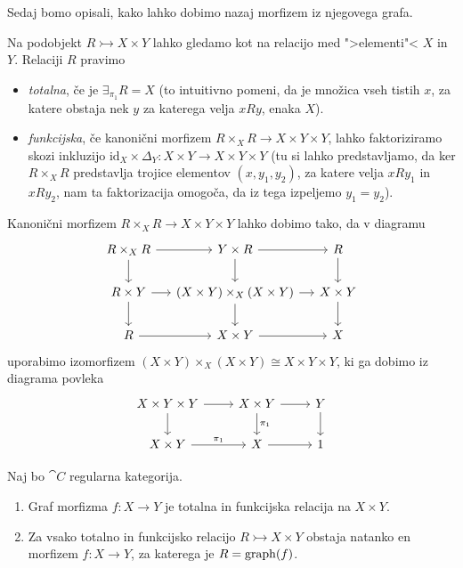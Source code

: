 \documentclass[../kategoricna_logika.tex]{subfiles}
\begin{document}
Sedaj bomo opisali, kako lahko dobimo nazaj morfizem iz njegovega
grafa.
\begin{definicija}
  Na podobjekt $R \rightarrowtail X \times Y$ lahko gledamo kot na
  relacijo med ">elementi"< $X$ in $Y$. Relaciji $R$ pravimo
  \begin{itemize}
  \item \emph{totalna}, če je $\exists_{\pi_1}R = X$ (to intuitivno
    pomeni, da je množica vseh tistih $x$, za katere obstaja nek $y$
    za katerega velja $xRy$, enaka $X$).
  \item \emph{funkcijska}, če kanonični morfizem
    $R \times_X R \to X \times Y \times Y$, lahko faktoriziramo skozi
    inkluzijo
    $\mathrm{id}_X \times \Delta_Y : X \times Y \to X \times Y \times
    Y$ (tu si lahko predstavljamo, da ker $R \times_X R$ predstavlja
    trojice elementov $(x, y_1, y_2)$, za katere velja $xRy_1$ in
    $xRy_2$, nam ta faktorizacija omogoča, da iz tega izpeljemo
    $y_1 = y_2$).
  \end{itemize}
\end{definicija}
\begin{opomba}
  Kanonični morfizem $R \times_X R \to X \times Y \times Y$ lahko
  dobimo tako, da v diagramu
  \begin{equation*}
    \begin{tikzcd}[row sep=normal, column sep=small]
      R \times_X R \ar[d] \ar[r] & Y \times R \ar[d] \ar[r] & R \ar[d] \\
      R \times Y \ar[d] \ar[r] & (X \times Y) \times_X (X \times Y)
      \ar[d] \ar[r] &
      X \times Y \ar[d] \\
      R \ar[r] & X \times Y \ar[r] & X
    \end{tikzcd}
  \end{equation*}
  uporabimo izomorfizem
  $(X \times Y) \times_X (X \times Y) \cong X \times Y \times Y$, ki
  ga dobimo iz diagrama povleka
  \begin{equation*}
    \begin{tikzcd}[row sep=normal, column sep=normal]
      X \times Y  \times Y\ar[d] \ar[r] & X \times Y \ar[d, "\pi_1"] \ar[r] & Y \ar[d] \\
      X \times Y \ar[r, "\pi_1"] & X \ar[r] & 1
    \end{tikzcd}
  \end{equation*}
\end{opomba}
\begin{lema}\label{lema:funkcijska-relacija-ima-graf}
  Naj bo $\cat{C}$ regularna kategorija.
  \begin{enumerate}[label=(\roman*)]
  \item Graf morfizma $f : X \to Y$ je totalna in funkcijska relacija
    na $X \times Y$.
  \item Za vsako totalno in funkcijsko relacijo
    $R \rightarrowtail X \times Y$ obstaja natanko en morfizem
    $f : X \to Y$, za katerega je $R = \operatorname{graph}(f)$.
  \end{enumerate}
\end{lema}
\end{document}
